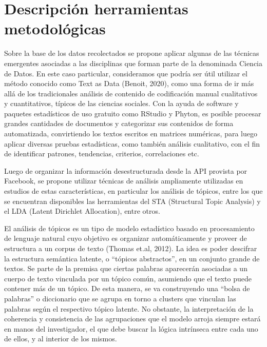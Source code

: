 \documentclass[
  10pt,
  letterpaper,
]{report}
\begin{document}
\hypertarget{descripciuxf3n-herramientas-metodoluxf3gicas}{%
\section{Descripción herramientas
metodológicas}\label{descripciuxf3n-herramientas-metodoluxf3gicas}}

Sobre la base de los datos recolectados se propone aplicar algunas de
las técnicas emergentes asociadas a las disciplinas que forman parte de
la denominada Ciencia de Datos. En este caso particular, consideramos
que podría ser útil utilizar el método conocido como Text as Data
(Benoit, 2020), como una forma de ir más allá de los tradicionales
análisis de contenido de codificación manual cualitativos y
cuantitativos, típicos de las ciencias sociales. Con la ayuda de
software y paquetes estadísticos de uso gratuito como RStudio y Phyton,
es posible procesar grandes cantidades de documentos y categorizar sus
contenidos de forma automatizada, convirtiendo los textos escritos en
matrices numéricas, para luego aplicar diversas pruebas estadísticas,
como también análisis cualitativo, con el fin de identificar patrones,
tendencias, criterios, correlaciones etc.

Luego de organizar la información desestructurada desde la API provista
por Facebook, se propone utilizar técnicas de análisis ampliamente
utilizadas en estudios de estas características, en particular los
análisis de tópicos, entre los que se encuentran disponibles las
herramientas del STA (Structural Topic Analysis) y el LDA (Latent
Dirichlet Allocation), entre otros.

El análisis de tópicos es un tipo de modelo estadístico basado en
procesamiento de lenguaje natural cuyo objetivo es organizar
automáticamente y proveer de estructura a un corpus de texto (Thomas
et.al, 2012). La idea es poder descifrar la estructura semántica
latente, o ``tópicos abstractos'', en un conjunto grande de textos. Se
parte de la premisa que ciertas palabras aparecerán asociadas a un
cuerpo de texto vinculada por un tópico común, asumiendo que el texto
puede contener más de un tópico. De esta manera, se va construyendo una
``bolsa de palabras'' o diccionario que se agrupa en torno a clusters
que vinculan las palabras según el respectivo tópico latente. No
obstante, la interpretación de la coherencia y consistencia de las
agrupaciones que el modelo arroja siempre estará en manos del
investigador, el que debe buscar la lógica intrínseca entre cada uno de
ellos, y al interior de los mismos.
\end{document}
